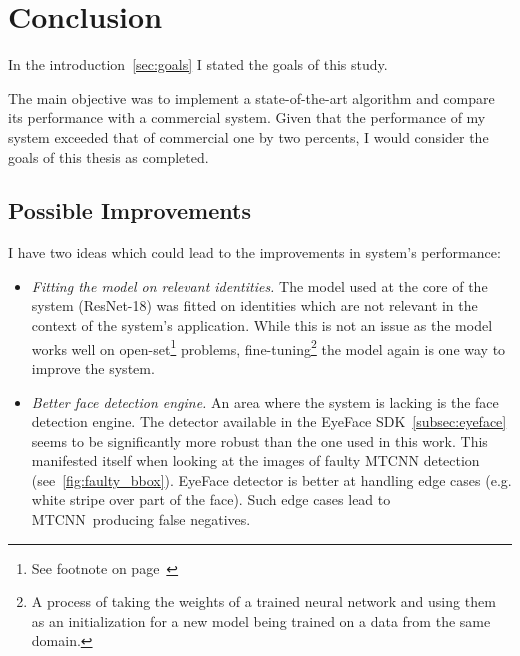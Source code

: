 \chapter{Conclusion}\label{ch:conclusion}
In the introduction~\ref{sec:goals} I stated the goals of this study.

The main objective was to implement a state-of-the-art algorithm and compare its performance with a commercial system.
Given that the performance of my system exceeded that of commercial one by two percents, I would consider the goals
of this thesis as completed.

\section{Possible Improvements}\label{sec:possible-improvements}
I have two ideas which could lead to the improvements in system's performance:
\begin{itemize}
    \item \textit{Fitting the model on relevant identities.} The model used at the core of the system (ResNet-18) was
    fitted on identities which are not relevant in the context of the system's application.
    While this is not an issue as the model works well on open-set\footnote{See footnote on page~\pageref{foot:openset}}
    problems, fine-tuning\footnote{A process of taking the weights of a trained neural network and using them as
    an initialization for a new model being trained on a data from the same domain.} the model again is one way to
    improve the system.
    \item \textit{Better face detection engine.} An area where the system is lacking is the face detection engine.
    The detector available in the EyeFace SDK~\ref{subsec:eyeface} seems to be significantly more robust than the one
    used in this work.
    This manifested itself when looking at the images of faulty MTCNN detection (see~\ref{fig:faulty_bbox}).
    EyeFace detector is better at handling edge cases (e.g. white stripe over part of the face).
    Such edge cases lead to MTCNN producing false negatives.
\end{itemize}
